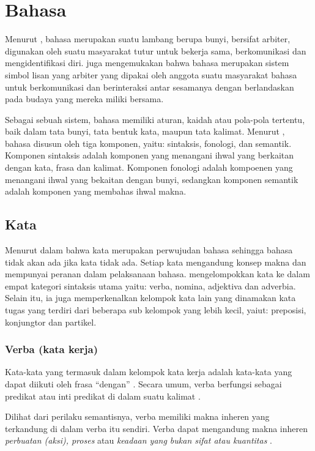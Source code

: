 \section{Bahasa} %
\label{sec:section_name}
Menurut \citet{chaer}, bahasa merupakan suatu lambang berupa bunyi, bersifat arbiter, digunakan oleh suatu masyarakat tutur untuk bekerja sama, berkomunikasi dan mengidentifikasi diri. \citet{dardjo} juga mengemukakan bahwa bahasa merupakan sistem simbol lisan yang arbiter yang dipakai oleh anggota suatu masyarakat bahasa untuk berkomunikasi dan berinteraksi antar sesamanya dengan berlandaskan pada budaya yang mereka miliki bersama.

Sebagai sebuah sistem, bahasa memiliki aturan, kaidah atau pola-pola tertentu, baik dalam tata bunyi, tata bentuk kata, maupun tata kalimat. Menurut \citet{dardjo}, bahasa disusun oleh tiga komponen, yaitu: sintaksis, fonologi, dan semantik. Komponen sintaksis adalah komponen yang menangani ihwal yang berkaitan dengan kata, frasa dan kalimat. Komponen fonologi adalah kompoenen yang menangani ihwal yang bekaitan dengan bunyi, sedangkan komponen semantik adalah komponen yang membahas ihwal makna.

\subsection{Kata}
Menurut \citet{chaer} dalam \citet{suryawan} bahwa kata merupakan perwujudan bahasa sehingga bahasa tidak akan ada jika kata tidak ada. Setiap kata mengandung konsep makna dan mempunyai peranan dalam pelaksanaan bahasa. \citet{alwi} mengelompokkan kata ke dalam empat kategori sintaksis utama yaitu: verba, nomina, adjektiva dan adverbia. Selain itu, ia juga memperkenalkan kelompok kata lain yang dinamakan kata tugas yang terdiri dari beberapa sub kelompok yang lebih kecil, yaiut: preposisi, konjungtor dan partikel.

\subsubsection{Verba (kata kerja)}
Kata-kata yang termasuk dalam kelompok kata kerja adalah kata-kata yang dapat diikuti oleh frasa ``dengan'' \citet{chaer}. Secara umum, verba berfungsi sebagai predikat atau inti predikat di dalam suatu kalimat \citep{alwi}.

Dilihat dari perilaku semantisnya, verba memiliki makna inheren yang terkandung di dalam verba itu sendiri. Verba dapat mengandung makna inheren \emph{perbuatan (aksi), proses} atau \emph{keadaan yang bukan sifat atau kuantitas} \citep{alwi}.

